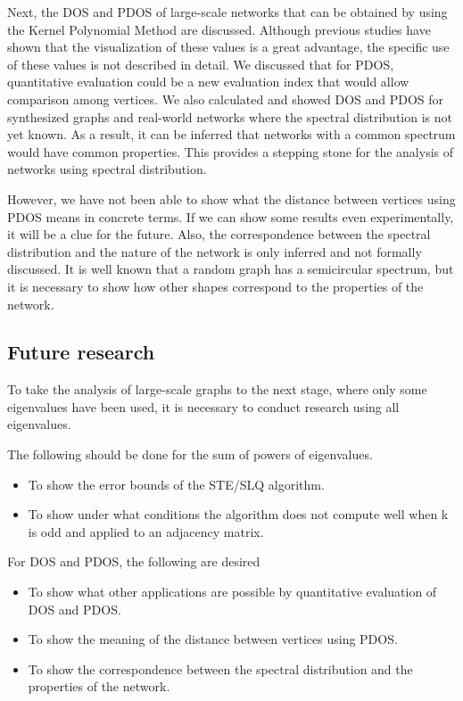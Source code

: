 \documentclass[senior,final,11pt]{iscs-thesis}
\begin{document}
Next, the DOS and PDOS of large-scale networks that can be obtained by using the Kernel Polynomial Method are discussed. Although previous studies have shown that the visualization of these values is a great advantage, the specific use of these values is not described in detail. We discussed that for PDOS, quantitative evaluation could be a new evaluation index that would allow comparison among vertices. We also calculated and showed DOS and PDOS for synthesized graphs and real-world networks where the spectral distribution is not yet known. As a result, it can be inferred that networks with a common spectrum would have common properties. This provides a stepping stone for the analysis of networks using spectral distribution.

However, we have not been able to show what the distance between vertices using PDOS means in concrete terms. If we can show some results even experimentally, it will be a clue for the future. Also, the correspondence between the spectral distribution and the nature of the network is only inferred and not formally discussed. It is well known that a random graph has a semicircular spectrum, but it is necessary to show how other shapes correspond to the properties of the network.

\subsection*{Future research}
To take the analysis of large-scale graphs to the next stage, where only some eigenvalues have been used, it is necessary to conduct research using all eigenvalues.

The following should be done for the sum of powers of eigenvalues.
\begin{itemize}
    \item To show the error bounds of the STE/SLQ algorithm.
    \item To show under what conditions the algorithm does not compute well when k is odd and applied to an adjacency matrix.
\end{itemize}

For DOS and PDOS, the following are desired
\begin{itemize}
    \item To show what other applications are possible by quantitative evaluation of DOS and PDOS.
    \item To show the meaning of the distance between vertices using PDOS.
    \item To show the correspondence between the spectral distribution and the properties of the network.
\end{itemize}
\end{document}
